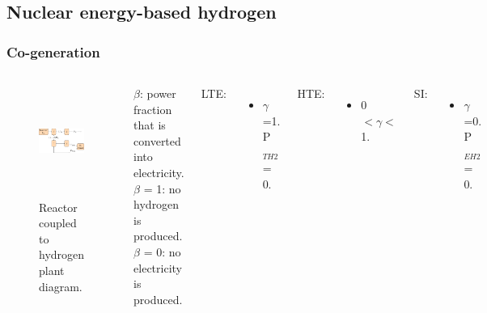 \subsection{Nuclear energy-based hydrogen}
\begin{frame}
\frametitle{Co-generation}
\begin{columns}
    \column[t]{6.5cm}
   	\begin{figure}[htbp!]
		\begin{center}
			\includegraphics[height=3.6cm]{images/hte-figure0.png}
		\end{center}
		\caption{Reactor coupled to hydrogen plant diagram.}
 	\end{figure}

 	\column[t]{3.5cm}
 	$\beta$: power fraction that is converted into electricity.
 	\\
    $\beta$ = 1: no hydrogen is produced.
    \\
 	$\beta$ = 0: no electricity is produced. \vspace{0.6cm}

 	LTE:
 	\begin{itemize}
 		\item $\gamma$=1. P$_{TH2}$ = 0.
 	\end{itemize}

 	HTE:
 	\begin{itemize}
 		\item 0 $< \gamma <$ 1.
 	\end{itemize}

    SI:
 	\begin{itemize}
 		\item $\gamma$=0. P$_{EH2}$ = 0.
 	\end{itemize}


\end{columns}
\end{frame}